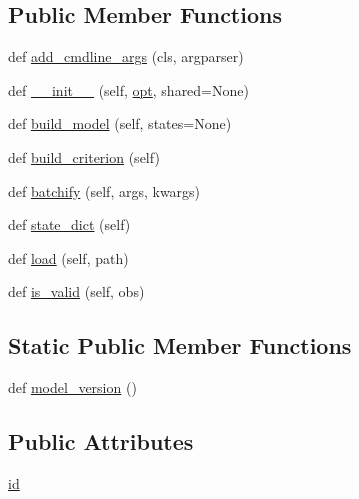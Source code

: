 \subsection*{Public Member Functions}
\begin{DoxyCompactItemize}
\item 
def \hyperlink{classparlai_1_1agents_1_1seq2seq_1_1seq2seq_1_1Seq2seqAgent_a1287bfcdb2072a431bbbd513c36043a9}{add\+\_\+cmdline\+\_\+args} (cls, argparser)
\item 
def \hyperlink{classparlai_1_1agents_1_1seq2seq_1_1seq2seq_1_1Seq2seqAgent_a7d1af2d90ac02cd2c7401185c2d09c3e}{\+\_\+\+\_\+init\+\_\+\+\_\+} (self, \hyperlink{classparlai_1_1core_1_1torch__agent_1_1TorchAgent_a785bb920cf8c8afc3e9bf6a8b77e335a}{opt}, shared=None)
\item 
def \hyperlink{classparlai_1_1agents_1_1seq2seq_1_1seq2seq_1_1Seq2seqAgent_a43422bdf284bfc06a9bd2db434a7167c}{build\+\_\+model} (self, states=None)
\item 
def \hyperlink{classparlai_1_1agents_1_1seq2seq_1_1seq2seq_1_1Seq2seqAgent_aad570608fb05da482411201aa2e0b47f}{build\+\_\+criterion} (self)
\item 
def \hyperlink{classparlai_1_1agents_1_1seq2seq_1_1seq2seq_1_1Seq2seqAgent_ab7917b41c18eea62f9e7b63c36466bb6}{batchify} (self, args, kwargs)
\item 
def \hyperlink{classparlai_1_1agents_1_1seq2seq_1_1seq2seq_1_1Seq2seqAgent_a7b68df3db0fcadb70a97a28ec2617cb2}{state\+\_\+dict} (self)
\item 
def \hyperlink{classparlai_1_1agents_1_1seq2seq_1_1seq2seq_1_1Seq2seqAgent_a6f94b2896a2a76476f8646ec7d9360ed}{load} (self, path)
\item 
def \hyperlink{classparlai_1_1agents_1_1seq2seq_1_1seq2seq_1_1Seq2seqAgent_a6fbfdde4ec69ec4050fa4005c6608f1a}{is\+\_\+valid} (self, obs)
\end{DoxyCompactItemize}
\subsection*{Static Public Member Functions}
\begin{DoxyCompactItemize}
\item 
def \hyperlink{classparlai_1_1agents_1_1seq2seq_1_1seq2seq_1_1Seq2seqAgent_aba4b52b4f15795eeda202cb303525483}{model\+\_\+version} ()
\end{DoxyCompactItemize}
\subsection*{Public Attributes}
\begin{DoxyCompactItemize}
\item 
\hyperlink{classparlai_1_1agents_1_1seq2seq_1_1seq2seq_1_1Seq2seqAgent_a5254266798a52da5d4df057f5d8dc213}{id}
\end{DoxyCompactItemize}
